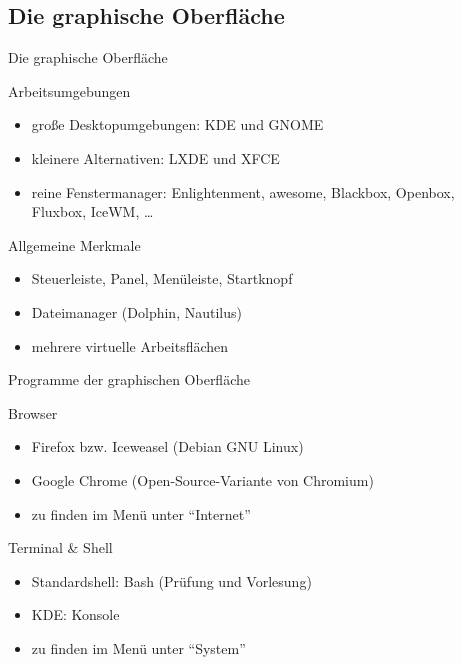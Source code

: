 \documentclass[aspectratio=43]{beamer}
\begin{document}
\subsection{Die graphische Oberfläche}
\begin{frame}{Die graphische Oberfläche}
  \begin{block}{Arbeitsumgebungen}
    \begin{itemize}
      \item große Desktopumgebungen: KDE und GNOME
      \item kleinere Alternativen: LXDE und XFCE
      \item reine Fenstermanager: Enlightenment, awesome, Blackbox, Openbox, Fluxbox, IceWM, \dots
    \end{itemize}
  \end{block}
  \begin{block}{Allgemeine Merkmale}
    \begin{itemize}
      \item Steuerleiste, Panel, Menüleiste, Startknopf
      \item Dateimanager (Dolphin, Nautilus)
      \item mehrere virtuelle Arbeitsflächen
    \end{itemize}
  \end{block}
\end{frame}

\begin{frame}{Programme der graphischen Oberfläche}
  \begin{block}{Browser}
    \begin{itemize}
      \item Firefox bzw. Iceweasel (Debian GNU Linux)
      \item Google Chrome (Open-Source-Variante von Chromium)
      \item zu finden im Menü unter ``Internet''
    \end{itemize}
  \end{block}
  \begin{block}{Terminal \& Shell}
    \begin{itemize}
      \item Standardshell: Bash (Prüfung und Vorlesung)
      \item KDE: Konsole
      \item zu finden im Menü unter ``System''
    \end{itemize}
  \end{block}
\end{frame}
\end{document}
